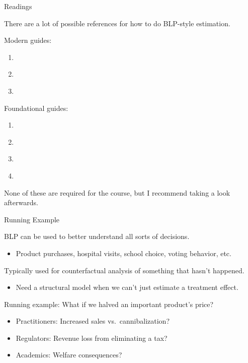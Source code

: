 \documentclass[aspectratio=169,t,11pt,table]{beamer}
\begin{document}
\begin{frame}{Readings}
    \begin{wideitemize}
        \item There are a lot of possible references for how to do BLP-style estimation.
        \pause
        \item Modern guides:
        \begin{enumerate}
            \item \cite{berry2021foundations}
            \item \cite{conlon2020best}
            \item \cite{conlon2025incorporating}
        \end{enumerate}
        \pause
        \item Foundational guides:
        \begin{enumerate}
            \item \cite*{berry1995automobile}
            \item \cite{nevo2000practitioner}
            \item \cite{petrin2002quantifying}
            \item \cite*{berry2004differentiated}
        \end{enumerate}
        \pause
        \item None of these are required for the course, but I recommend taking a look afterwards.
    \end{wideitemize}
\end{frame}

\begin{frame}{Running Example}
    \begin{wideitemize}
        \item BLP can be used to better understand all sorts of decisions.
        \begin{itemize}
            \item Product purchases, hospital visits, school choice, voting behavior, etc.
        \end{itemize}
        \pause
        \item Typically used for \alert{counterfactual analysis} of something that hasn't happened.
        \begin{itemize}
            \item Need a structural model when we can't just estimate a treatment effect.
        \end{itemize}
        \pause
        \item Running example: \alert{What if we halved an important product's price?}
        \begin{itemize}
            \item Practitioners: Increased sales vs.\ cannibalization?
            \item Regulators: Revenue loss from eliminating a tax?
            \item Academics: Welfare consequences?
        \end{itemize}
    \end{wideitemize}
\end{frame}
\end{document}
